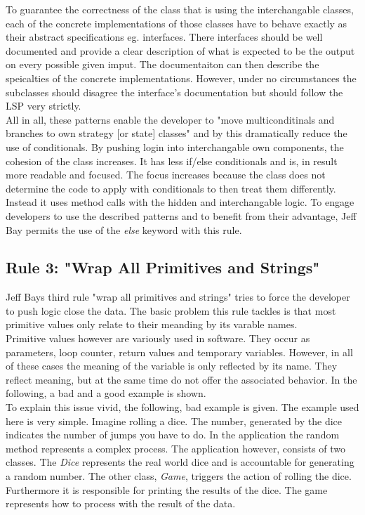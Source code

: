  To guarantee the correctness of the class that is using the interchangable classes, each of the concrete implementations of those classes have to behave exactly as their abstract specifications eg. interfaces. There interfaces should be well documented and provide a clear description of what is expected to be the output on every possible given imput. The documentaiton can then describe the speicalties of the concrete implementations. However, under no circumstances the subclasses should disagree the interface's documentation but should follow the \acf{LSP} very strictly. \\

 All in all, these patterns enable the developer to "move multiconditinals and branches to own strategy [or state] classes"\cite{gof} and by this dramatically reduce the use of conditionals. By pushing login into interchangable own components, the cohesion of the class increases. It has less if/else conditionals and is, in result more readable and focused. The focus increases because the class does not determine the code to apply with conditionals to then treat them differently. Instead it uses method calls with the hidden and interchangable logic. To engage developers to use the described patterns and to benefit from their advantage, Jeff Bay permits the use of the \textit{else} keyword with this rule. 

\subsection{Rule 3: "Wrap All Primitives and Strings"}
Jeff Bays third rule "wrap all primitives and strings" tries to force the developer to push logic close the data. The basic problem this rule tackles is that most primitive values only relate to their meanding  by its varable names. \\

Primitive values however are variously used in software. They occur as parameters, loop counter, return values and temporary variables. However, in all of these cases the meaning of the variable is only reflected by its name. They reflect meaning, but at the same time do not offer the associated behavior. In the following, a bad and a good example is shown. \\

To explain this issue vivid, the following, bad example is given. The example used here is very simple. Imagine rolling a dice. The number, generated by the dice indicates the number of jumps you have to do. In the application the random method represents a complex process. The application however, consists of two classes. The \textit{Dice} represents the real world dice and is accountable for generating a random number. The other class, \textit{Game}, triggers the action of rolling the dice. Furthermore it is responsible for printing the results of the dice. The game represents how to process with the result of the data.   \\

